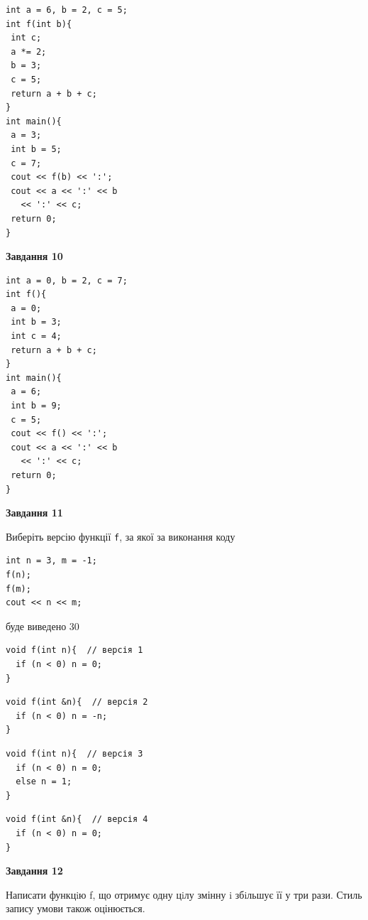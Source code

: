 \documentclass[12pt, ukrainian]{article}
\def\code#1{\Verb!#1!}
\begin{document}
{\begin {large}
\begin{minipage}[t]{7.0cm}
\begin{verbatim}
int a = 6, b = 2, c = 5;
int f(int b){
 int c;
 a *= 2;
 b = 3;
 c = 5;
 return a + b + c;
}
int main(){
 a = 3;
 int b = 5;
 c = 7;
 cout << f(b) << ':';
 cout << a << ':' << b 
   << ':' << c;
 return 0;
}
\end{verbatim}



\begin{center}
\textbf{Завдання 10}
\end{center}
\vspace{-8mm}

\begin{verbatim}
int a = 0, b = 2, c = 7;
int f(){
 a = 0;
 int b = 3;
 int c = 4;
 return a + b + c;
}
int main(){
 a = 6;
 int b = 9;
 c = 5;
 cout << f() << ':';
 cout << a << ':' << b 
   << ':' << c;
 return 0;
}
\end{verbatim}

\end{minipage}
\vline \hspace{1mm}
\begin{minipage}[t]{11.0cm}

\begin{center}
\textbf{Завдання 11}
\end{center}
Виберіть версію функції \code{f}, за якої за виконання коду
\begin{verbatim}
int n = 3, m = -1;
f(n);
f(m);
cout << n << m;
\end{verbatim}

буде виведено 30

\begin{verbatim}
void f(int n){  // версія 1
  if (n < 0) n = 0;
}
\end{verbatim}

\vspace{-8mm}\begin{verbatim}
void f(int &n){  // версія 2
  if (n < 0) n = -n;
}
\end{verbatim}

\vspace{-8mm}\begin{verbatim}
void f(int n){  // версія 3
  if (n < 0) n = 0;
  else n = 1;
}
\end{verbatim}

\vspace{-8mm}\begin{verbatim}
void f(int &n){  // версія 4
  if (n < 0) n = 0;
}
\end{verbatim}



\begin{center}
\textbf{Завдання 12}
\end{center}

Написати функцiю f, що отримує одну цiлу змінну i збiльшує її у три рази. Стиль запису умови також оцінюється.\par

\end{minipage}

\end {large}}
\newpage
\end{document}
